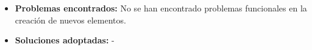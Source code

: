 \begin{itemize}
    \item \textbf{Problemas encontrados:} No se han encontrado problemas
    funcionales en la creación de nuevos elementos.
    \item \textbf{Soluciones adoptadas:} -
  \end{itemize}

